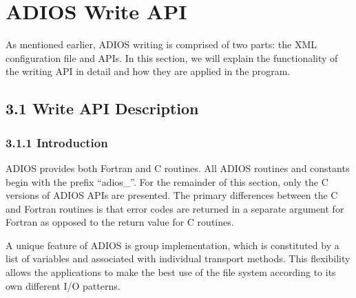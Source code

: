 \vspace{34pt}
\section{ADIOS Write API}

\vspace{24pt}
\parindent=0pt
As mentioned earlier, ADIOS writing is comprised of two parts: the XML configuration 
file and APIs. In this section, we will explain the functionality of the writing 
API in detail and how they are applied in the program.  

\vspace{24pt}
\subsection*{{\large 3.1 }{\large \textbf{ \label{HToc82064259}\label{HToc82067515}\label{HToc84890234}\label{HToc212016610}\label{HToc212016852}\label{HToc182553348}Write 
API Description\label{HToc84890235}\label{HToc212016611}\label{HToc212016853}\label{HToc182553349}}}}

\vspace{10pt}
\subsubsection*{{\large \textbf{3.1.1 Introduction}}}

\vspace{10pt}
ADIOS provides both Fortran and C routines. All ADIOS routines and constants begin 
with the prefix ``adios\_''. For the remainder of this section, only the C versions 
of ADIOS APIs are presented. The primary differences between the C and Fortran 
routines is that error codes are returned in a separate argument for Fortran as 
opposed to the return value for C routines. 

\vspace{10pt}
A unique feature of ADIOS is group implementation, which is constituted by a list 
of variables and associated with individual transport methods. This flexibility 
allows the applications to make the best use of the file system according to its 
own different I/O patterns.\label{HToc84890236}\label{HToc212016612}\label{HToc212016854}\label{HToc182553350}


